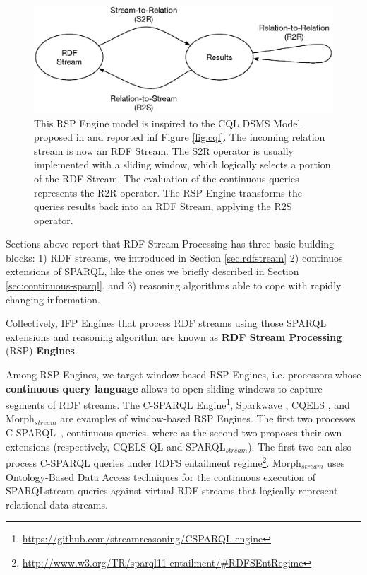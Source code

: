 \begin{figure}[tbh]
  \centering
	\includegraphics[width=\linewidth]{images/rsp-engine-model}
	\caption[RSP Engine Model]{This RSP Engine model is inspired to the CQL DSMS Model proposed in \cite{Arasu2006} and reported inf Figure \ref{fig:cql}. The incoming relation stream is now an RDF Stream. The S2R operator is usually implemented with a sliding window, which logically selects a portion of the RDF Stream. The evaluation of the continuous queries represents the R2R operator. The RSP Engine transforms the queries results back into an RDF Stream, applying the R2S operator.} 
  	\label{fig:rsp-engine-model}
\end{figure}

Sections above report that RDF Stream Processing has three basic building blocks: 1) RDF streams, we introduced in Section \ref{sec:rdfstream} 2) continuos extensions of SPARQL, like the ones we briefly described in Section \ref{sec:continuous-sparql}, and 3) reasoning algorithms able to cope with rapidly changing information.

Collectively, IFP Engines that process RDF streams using those SPARQL extensions and reasoning algorithm are known as \textbf{RDF Stream Processing} (RSP) \textbf{Engines}.

Among RSP Engines, we target window-based RSP Engines, i.e. processors whose \textbf{continuous query language} allows to open sliding windows to capture segments of RDF streams. The C-SPARQL Engine\footnote{\url{https://github.com/streamreasoning/CSPARQL-engine}}, Sparkwave \cite{DBLP:conf/debs/KomazecCF12}, CQELS \cite{Lephuoc2011}, and Morph$_{stream}$ \cite{DBLP:journals/ijswis/CalbimonteJCA12}  are examples of window-based RSP Engines. The first two processes C-SPARQL~\cite{Barbieri2010}, continuous queries, where as the second two proposes their own extensions (respectively, CQELS-QL and SPARQL$_{stream}$). The first two can also process C-SPARQL queries under RDFS entailment regime\footnote{\url{http://www.w3.org/TR/sparql11-entailment/#RDFSEntRegime}}. 
Morph$_{stream}$ uses Ontology-Based Data Access techniques for the continuous execution of SPARQLstream queries against virtual RDF streams that logically represent relational data streams.

